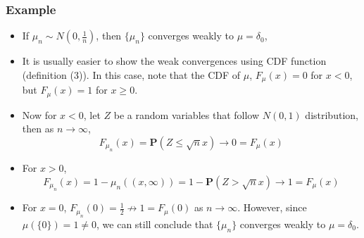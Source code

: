 \documentclass[handout]{beamer}
\newcommand{\BP}{\mathbf{P}}
\begin{document}
\frame
{
  \frametitle{Example} 

   \begin{itemize}
          
                     
                     \item<1-> If $\mu_n\sim N(0,\frac{1}{n} )$, then $\{\mu_n\}$ converges weakly to $\mu=\delta_0$,   
                     
                                         
                     \item<2-> It is usually easier to show the weak convergences using CDF function (definition (3)). In this case, note that the CDF of $\mu$, $F_{\mu} (x)=0$ for $x<0$, but $F_{\mu}(x)=1$ for $x\geq 0$. 
                     
                     \item<3-> Now for $x<0$, let $Z$ be a random variables that follow $N(0, 1)$ distribution, then as $n\rightarrow \infty$,  $$F_{\mu_n} (x)=\BP(Z\leq \sqrt{n} x)\rightarrow 0=F_{\mu} (x)$$                      
                    \item<4-> For $x>0$, $$F_{\mu_n} (x)=1-\mu_n((x,\infty) )=1-\BP(Z> \sqrt{n} x)\rightarrow 1=F_{\mu} (x)$$ 
                    
                    \item<5-> For $x=0$, $F_{\mu_n} (0)=\frac{1}{2} \not \rightarrow 1=F_{\mu} (0)$ as $n\rightarrow \infty$. However, since $\mu(\{0\})=1\neq 0$, we can still conclude that $\{\mu_n\}$ converges weakly to $\mu=\delta_0$. 

                                                                                       
                                               \end{itemize}
}
\end{document}
